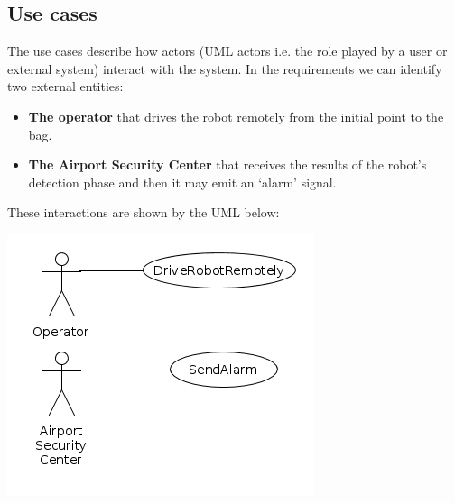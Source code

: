 \documentclass{llncs}
\newcommand{\labelssec}[1]{\label{ssec:#1}}
\begin{document}
\subsection{Use cases}
\labelssec{UseCases}
The use cases describe how actors (UML actors i.e. the role played by a user or external system) interact with the system.
In the requirements we can identify two external entities:
\begin{itemize}
\item \textbf{The operator} that drives the robot remotely from the initial point to the bag.
\item \textbf{The Airport Security Center} that receives the results of the robot's detection phase and then it may emit an `alarm' signal.
\end{itemize}
These interactions are shown by the UML below:

\includegraphics[scale=0.5]{./img/usecase.png}
\end{document}
